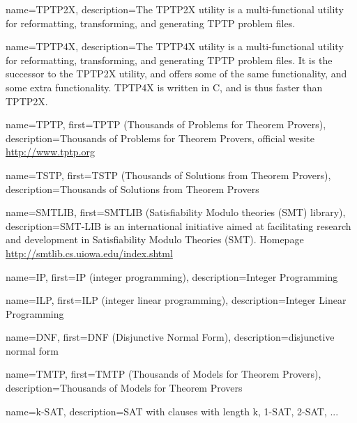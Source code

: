  {
    name=TPTP2X,
    description={The TPTP2X utility is a multi-functional utility for reformatting, transforming, and generating TPTP problem files.}
}

 {
    name=TPTP4X,
    description={The TPTP4X utility is a multi-functional utility for reformatting, transforming, and generating TPTP problem files. It is the successor to the TPTP2X utility, and offers some of the same functionality, and some extra functionality. TPTP4X is written in C, and is thus faster than TPTP2X.}
}

 {
    name=TPTP,
    first={TPTP (Thousands of Problems for Theorem Provers)},
    description={Thousands of Problems for Theorem Provers, official wesite \url{http://www.tptp.org}}
}

 {
    name=TSTP,
    first={TSTP (Thousands of Solutions from Theorem Provers)},
    description={Thousands of Solutions from Theorem Provers}
}

 {
    name=SMTLIB,
    first={SMTLIB (Satisfiability Modulo theories (SMT) library)},
    description={SMT-LIB is an international initiative aimed at facilitating research and development in Satisfiability Modulo Theories (SMT). Homepage \url{http://smtlib.cs.uiowa.edu/index.shtml}}
}

 {
    name=IP,
    first={IP (integer programming)},
    description={Integer Programming}
}

 {
    name=ILP,
    first={ILP (integer linear programming)},
    description={Integer Linear Programming}
}

 {
    name=DNF,
    first={DNF (Disjunctive Normal Form)},
    description={disjunctive normal form}
}

 {
    name=TMTP,
    first={TMTP (Thousands of Models for Theorem Provers)},
    description={Thousands of Models for Theorem Provers}
}

 {
    name=k-SAT,
    description={SAT with clauses with length k, 1-SAT, 2-SAT, ...}
}
